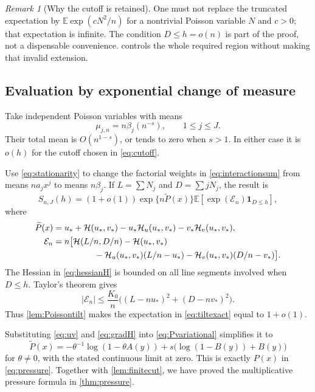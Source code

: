 \documentclass[11pt,a4paper]{article}
\theoremstyle{definition}
\theoremstyle{remark}
\newtheorem{remark}[theorem]{Remark}
\newcommand{\E}{\mathbb E}
\newcommand{\ind}{\mathbf 1}
\numberwithin{equation}{section}
\begin{document}
\begin{remark}[Why the cutoff is retained]
One must not replace the truncated expectation by
$\E\exp(cN^2/n)$ for a nontrivial Poisson variable $N$ and $c>0$;
that expectation is infinite. The condition $D\le h=o(n)$ is part of
the proof, not a dispensable convenience.  controls
the whole required region without making that invalid extension.
\end{remark}

\subsection{Evaluation by exponential change of measure}
Take independent Poisson variables with means
\begin{equation}
 \mu_{j,n}=n\beta_j(n^{-s}),\qquad1\le j\le J.
 \label{eq:means}
\end{equation}
Their total mean is $O(n^{1-s})$, or tends to zero when $s>1$.
In either case it is $o(h)$ for the cutoff chosen in
\eqref{eq:cutoff}.

Use \eqref{eq:stationarity} to change the factorial weights in
\eqref{eq:interactionsum} from means $na_jx^j$ to means $n\beta_j$.
If $L=\sum N_j$ and $D=\sum jN_j$, the result is
\begin{equation}
 S_{n,J}(h)=(1+o(1))\exp\{n\widetilde P(x)\}
     \E[\exp(\mathcal E_n)\ind_{D\le h}],
 \label{eq:tiltexact}
\end{equation}
where
\begin{align}
 \widetilde P(x)
 &=u_*+\mathcal H(u_*,v_*)
   -u_*\mathcal H_u(u_*,v_*)-v_*\mathcal H_v(u_*,v_*),
 \label{eq:Pvariational}\\
 \mathcal E_n
 &=n\bigl[\mathcal H(L/n,D/n)-\mathcal H(u_*,v_*)\notag\\
 &\hspace{17mm}
 -\mathcal H_u(u_*,v_*)(L/n-u_*)
 -\mathcal H_v(u_*,v_*)(D/n-v_*)\bigr].
 \label{eq:Eremainder}
\end{align}
The Hessian in \eqref{eq:hessianH} is bounded on all line segments
involved when $D\le h$. Taylor's theorem gives
\begin{equation}
 |\mathcal E_n|\le\frac{K_0}{n}
 \bigl((L-nu_*)^2+(D-nv_*)^2\bigr).
 \label{eq:remainderbound}
\end{equation}
Thus \cref{lem:Poissontilt} makes the expectation in
\eqref{eq:tiltexact} equal to $1+o(1)$.

Substituting \eqref{eq:uv} and \eqref{eq:gradH} into
\eqref{eq:Pvariational} simplifies it to
\[
 \widetilde P(x)=
 -\theta^{-1}\log(1-\theta A(y))
 +s\bigl(\log(1-B(y))+B(y)\bigr)
\]
for $\theta\ne0$, with the stated continuous limit at zero. This is
exactly $P(x)$ in \eqref{eq:pressure}. Together with
\cref{lem:finitecut}, we have proved the multiplicative pressure
formula in \cref{thm:pressure}.
\end{document}
